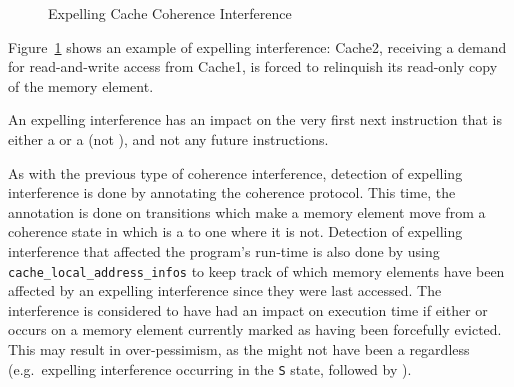 \begin{figure}[hbt!]
\begin{center}
\end{center}
\caption{Expelling Cache Coherence Interference}
\label{fig:expelling-interference}
\end{figure}

\begin{example}
Figure~\ref{fig:expelling-interference} shows an example of
expelling interference: Cache2, receiving
a demand for read-and-write access from Cache1, is forced to relinquish its
read-only copy of the memory element.
\end{example}

An expelling interference has an impact on the very first next instruction that
is either a \storeinstr{} or a \loadinstr{} (not \evictinstr{}), and not any
future instructions.

As with the previous type of coherence interference, detection of expelling
interference is done by annotating the coherence protocol. This time, the
annotation is done on transitions which make a memory element move from a
coherence state in which \loadinstr{} is a \hitact{} to one where it is not.
Detection of expelling interference that affected the program's run-time is also
done by using \lstinline!cache_local_address_infos! to keep track of which
memory elements have been affected by an expelling interference since they were
last accessed. The interference is considered to have had an impact on execution
time if either \loadinstr{} or \storeinstr{} occurs on a memory element
currently marked as having been forcefully evicted. This may result in
over-pessimism, as the \storeinstr{} might not have been a \hitact{} regardless
(e.g.~expelling interference occurring in the \texttt{S} state, followed by
\storeinstr{}).


